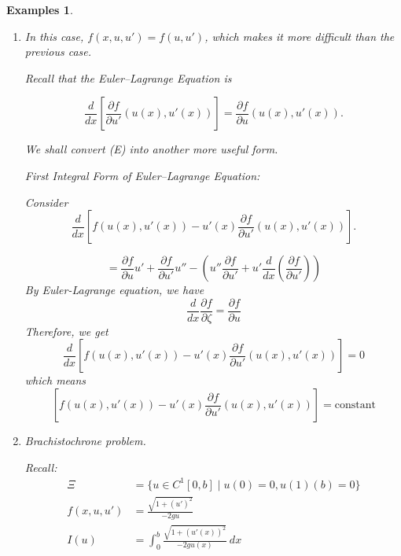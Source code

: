 \documentclass[12pt]{report}
\newtheorem{examples}{Examples}[section]
\begin{document}
\begin{examples}
\begin{enumerate}
An example would be  
\[
u_n (x) := n \left( x - \frac{1}{2} \right)^2 - \frac{n}{4}, \quad u_n: [0,1] \to \mathbb{R}
\]
for all \( n \in \mathbb{N} \). Then  
\[
u_n'(x) = 2n \left( x - \frac{1}{2} \right),
\]
and  

\[
I(u_n) = \int_{0}^{1} e^{-4n^2 (x - \frac{1}{2})^2} dx.
\]

By change of variables, let \( y = 2n (x - \frac{1}{2}) \), then we have  

\[
I(u_n) = \frac{1}{2n} \int_{-n}^{n} e^{-y^2} dy = \lim_{n \to \infty} \frac{1}{2n} \int_{-\infty}^{+\infty} e^{-y^2} dy.
\]

\[
= \lim_{n \to \infty} \frac{\sqrt{\pi}}{2n} = 0.
\]

Therefore, \( I \) has no minimizer in \( \Xi \).
\item 
In this case, $f(x, u, u') = f(u, u')$, which makes it more difficult than the previous case.



Recall that the Euler--Lagrange Equation is

\[
\frac{d}{dx} \left[ \frac{\partial f}{\partial u'}(u(x), u'(x)) \right] = \frac{\partial f}{\partial u}(u(x), u'(x)) \tag{E}.
\]

We shall convert (E) into another more useful form.

First Integral Form of Euler--Lagrange Equation:

Consider
\[
\frac{d}{dx} \left[ f(u(x), u'(x)) - u'(x) \frac{\partial f}{\partial u'}(u(x), u'(x)) \right].
\]

\[
= \frac{\partial f}{\partial u} u' + \frac{\partial f}{\partial u'} u'' - \left( u'' \frac{\partial f}{\partial u'} + u' \frac{d}{dx} \left( \frac{\partial f}{\partial u'} \right) \right)
\]
By Euler-Lagrange equation, we have
\[\frac{d}{dx}\frac{\partial f}{\partial \zeta} = \frac{\partial f}{\partial u}\]
Therefore, we get 
\[
\frac{d}{dx} \left[ f(u(x), u'(x)) - u'(x) \frac{\partial f}{\partial u'}(u(x), u'(x)) \right] = 0
\]
which means \[\left[ f(u(x), u'(x)) - u'(x) \frac{\partial f}{\partial u'}(u(x), u'(x)) \right] = \text{constant}\]
\item Brachistochrone problem.

Recall:
\begin{align*}
    \Xi &= \{ u \in C^1[0,b] \mid u(0) = 0, u(1)(b) = 0 \} \\
    f(x,u,u') &= \frac{\sqrt{1 + (u')^2}}{-2g u} \\
    I(u) &= \int_0^b \frac{\sqrt{1 + (u'(x))^2}}{-2g u(x)} \ dx
\end{align*}


\end{enumerate}
\end{examples}
\end{document}

